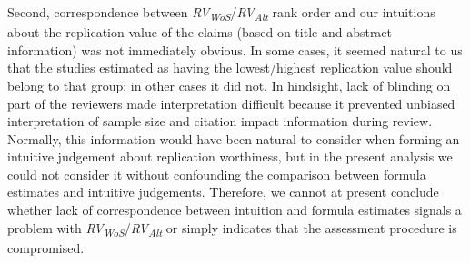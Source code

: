 \documentclass[
  man,floatsintext]{apa6}
\begin{document}
Second, correspondence between \emph{RV\textsubscript{WoS}}/\emph{RV\textsubscript{Alt}} rank order and our intuitions about the replication value of the claims (based on title and abstract information) was not immediately obvious. In some cases, it seemed natural to us that the studies estimated as having the lowest/highest replication value should belong to that group; in other cases it did not. In hindsight, lack of blinding on part of the reviewers made interpretation difficult because it prevented unbiased interpretation of sample size and citation impact information during review. Normally, this information would have been natural to consider when forming an intuitive judgement about replication worthiness, but in the present analysis we could not consider it without confounding the comparison between formula estimates and intuitive judgements. Therefore, we cannot at present conclude whether lack of correspondence between intuition and formula estimates signals a problem with \emph{RV\textsubscript{WoS}}/\emph{RV\textsubscript{Alt}} or simply indicates that the assessment procedure is compromised.
\end{document}
